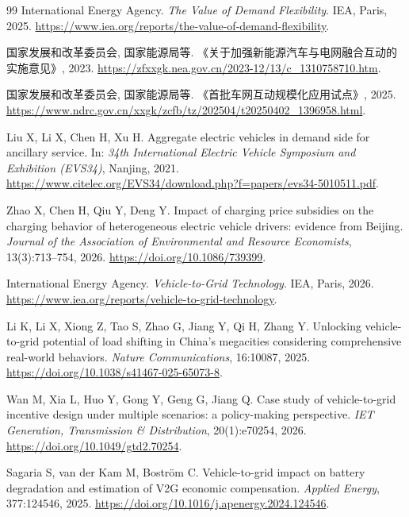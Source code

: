 \documentclass[UTF8,fontset=fandol,12pt]{ctexart}
\begin{document}
\begin{thebibliography}{99}
International Energy Agency.
\newblock \emph{The Value of Demand Flexibility}.
\newblock IEA, Paris, 2025.
\newblock \url{https://www.iea.org/reports/the-value-of-demand-flexibility}.

国家发展和改革委员会, 国家能源局等.
\newblock 《关于加强新能源汽车与电网融合互动的实施意见》, 2023.
\newblock \url{https://zfxxgk.nea.gov.cn/2023-12/13/c_1310758710.htm}.

国家发展和改革委员会, 国家能源局等.
\newblock 《首批车网互动规模化应用试点》, 2025.
\newblock \url{https://www.ndrc.gov.cn/xxgk/zcfb/tz/202504/t20250402_1396958.html}.

Liu X, Li X, Chen H, Xu H.
\newblock Aggregate electric vehicles in demand side for ancillary service.
\newblock In: \emph{34th International Electric Vehicle Symposium and
Exhibition (EVS34)}, Nanjing, 2021.
\newblock \url{https://www.citelec.org/EVS34/download.php?f=papers/evs34-5010511.pdf}.

Zhao X, Chen H, Qiu Y, Deng Y.
\newblock Impact of charging price subsidies on the charging behavior of
heterogeneous electric vehicle drivers: evidence from Beijing.
\newblock \emph{Journal of the Association of Environmental and Resource
Economists}, 13(3):713--754, 2026.
\newblock \url{https://doi.org/10.1086/739399}.

International Energy Agency.
\newblock \emph{Vehicle-to-Grid Technology}.
\newblock IEA, Paris, 2026.
\newblock \url{https://www.iea.org/reports/vehicle-to-grid-technology}.

Li K, Li X, Xiong Z, Tao S, Zhao G, Jiang Y, Qi H, Zhang Y.
\newblock Unlocking vehicle-to-grid potential of load shifting in China's
megacities considering comprehensive real-world behaviors.
\newblock \emph{Nature Communications}, 16:10087, 2025.
\newblock \url{https://doi.org/10.1038/s41467-025-65073-8}.

Wan M, Xia L, Huo Y, Gong Y, Geng G, Jiang Q.
\newblock Case study of vehicle-to-grid incentive design under multiple
scenarios: a policy-making perspective.
\newblock \emph{IET Generation, Transmission \& Distribution},
20(1):e70254, 2026.
\newblock \url{https://doi.org/10.1049/gtd2.70254}.

Sagaria S, van der Kam M, Boström C.
\newblock Vehicle-to-grid impact on battery degradation and estimation of V2G
economic compensation.
\newblock \emph{Applied Energy}, 377:124546, 2025.
\newblock \url{https://doi.org/10.1016/j.apenergy.2024.124546}.


\end{thebibliography}
\end{document}
